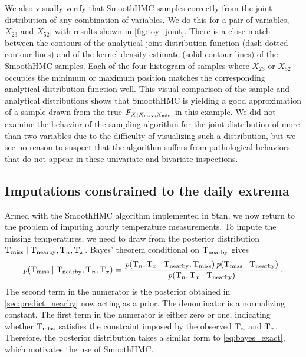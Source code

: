 We also visually verify that SmoothHMC samples correctly from the joint distribution of any combination of variables.
We do this for a pair of variables, \(X_{23}\) and \(X_{52}\), with results shown in \autoref{fig:toy_joint}.
There is a close match between the contours of the analytical joint distribution function (dash-dotted contour lines) and of the kernel density estimate (solid contour lines) of the SmoothHMC samples.
Each of the four histogram of samples where \(X_{23}\) or \(X_{52}\) occupies the minimum or maximum position matches the corresponding analytical distribution function well.
This visual comparison of the sample and analytical distributions shows that SmoothHMC is yielding a good approximation of a sample drawn from the true \(F_{X \mid X_{\max},X_{\min}}\) in this example.
We did not examine the behavior of the sampling algorithm for the joint distribution of more than two variables due to the difficulty of visualizing such a distribution,
but we see no reason to suspect that the algorithm suffers from pathological behaviors that do not appear in these univariate and bivariate inspections.

\subsection{Imputations constrained to the daily extrema}
\label{sec:constrained_imputations}

Armed with the SmoothHMC algorithm implemented in Stan, we now return to the problem of imputing hourly temperature measurements.
To impute the missing temperatures, we need to draw from the posterior distribution \(\mathrm{T}_{\mathrm{miss}} \mid \mathrm{T}_{\mathrm{nearby}}, \mathrm{T}_{n}, \mathrm{T}_{x}\).
Bayes' theorem conditional on \(\mathrm{T}_{\mathrm{nearby}}\) gives
\begin{equation}
    \prob\del{\Temp_\miss \mid \Temp_\obs, \Tn, \Tx} = \frac{
        \prob\del{\Tn, \Tx \mid \Temp_\obs, \Temp_\miss } 
        \prob\del{\Temp_\miss \mid \Temp_\obs}
        }{
        \prob\del{\Tn, \Tx \mid \Temp_\obs}
        }\,.
\end{equation}
The second term in the numerator is the posterior obtained in \autoref{sec:predict_nearby} now acting as a prior.
The denominator is a normalizing constant.
The first term in the numerator is either zero or one, indicating whether \(\mathrm{T}_{\mathrm{miss}}\) satisfies the constraint imposed by the observed \(\mathrm{T}_{n}\) and \(\mathrm{T}_{x}\).
Therefore, the posterior distribution takes a similar form to \autoref{eq:bayes_exact}, which motivates the use of SmoothHMC.

